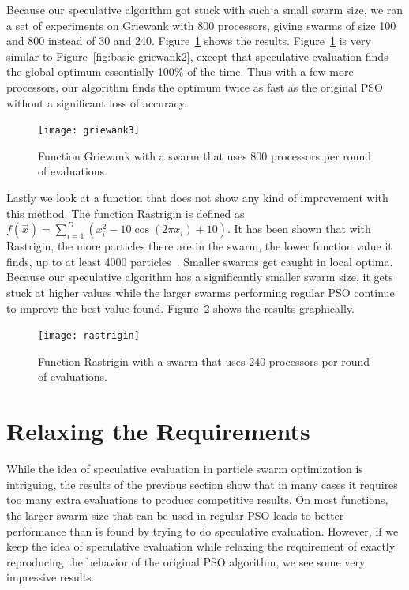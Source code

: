 \documentclass[journal,letterpaper]{IEEEtran}
\newcommand{\fig}[1]{Figure~\ref{fig:#1}}
\begin{document}
Because our speculative algorithm got stuck with such a small swarm size, we
ran a set of experiments on Griewank with 800 processors, giving swarms of size
100 and 800 instead of 30 and 240.  \fig{basic-griewank3} shows the results.
\fig{basic-griewank3} is very similar to \fig{basic-griewank2}, except that
speculative evaluation finds the global optimum essentially 100\% of the time.
Thus with a few more processors, our algorithm finds the optimum twice as fast
as the original PSO without a significant loss of accuracy.

\begin{figure}
  \centering
  \texttt{[image: griewank3]}
  \caption{Function Griewank with a swarm that uses 800 processors per round of
  evaluations.}
  \label{fig:basic-griewank3}
\end{figure}

Lastly we look at a function that does not show any kind of improvement with
this method.  The function Rastrigin is defined as $f(\Vec{x}) = \sum_{i=1}^D
\left(x_i^2 - 10\cos\left(2\pi x_i\right) + 10\right)$.  It has been shown that
with Rastrigin, the more particles there are in the swarm, the lower function
value it finds, up to at least 4000 particles~\cite{mcnabb-cec09}.  Smaller
swarms get caught in local optima.  Because our speculative algorithm has a
significantly smaller swarm size, it gets stuck at higher values while the
larger swarms performing regular PSO continue to improve the best value found.
\fig{rastrigin} shows the results graphically.

\begin{figure}
  \centering
  \texttt{[image: rastrigin]}
  \caption{Function Rastrigin with a swarm that uses 240 processors per round
  of evaluations.}
  \label{fig:rastrigin}
\end{figure}

\section{Relaxing the Requirements}
\label{sec:relax}

While the idea of speculative evaluation in particle swarm optimization is
intriguing, the results of the previous section show that in many cases it
requires too many extra evaluations to produce competitive results.  On most
functions, the larger swarm size that can be used in regular PSO leads to
better performance than is found by trying to do speculative evaluation.
However, if we keep the idea of speculative evaluation while relaxing the
requirement of exactly reproducing the behavior of the original PSO algorithm,
we see some very impressive results.
\end{document}
